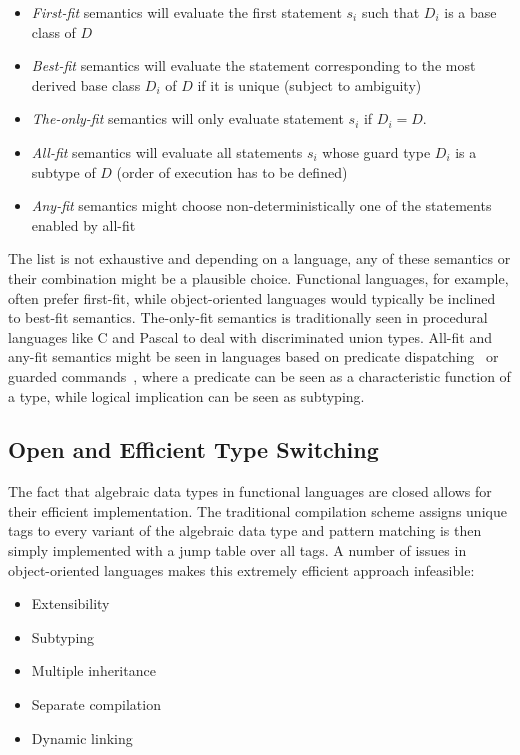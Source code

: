 \documentclass[preprint]{sigplanconf}
\begin{document}
\begin{itemize}
\setlength{\itemsep}{0pt}
\setlength{\parskip}{0pt}
\item \emph{First-fit} semantics will evaluate the first statement $s_i$ such 
      that $D_i$ is a base class of $D$
\item \emph{Best-fit} semantics will evaluate the statement corresponding to the 
      most derived base class $D_i$ of $D$ if it is unique (subject to 
      ambiguity)
\item \emph{The-only-fit} semantics will only evaluate statement $s_i$ if $D_i=D$.
\item \emph{All-fit} semantics will evaluate all statements $s_i$ whose guard 
      type $D_i$ is a subtype of $D$ (order of execution has to be defined)
\item \emph{Any-fit} semantics might choose non-deterministically one of the 
      statements enabled by all-fit
\end{itemize}

\noindent
The list is not exhaustive and depending on a language, any of these semantics 
or their combination might be a plausible choice. Functional languages, for 
example, often prefer first-fit, while object-oriented languages would typically 
be inclined to best-fit semantics. The-only-fit semantics is traditionally seen 
in procedural languages like C and Pascal to deal with discriminated union types. 
All-fit and any-fit semantics might be seen in languages based on predicate 
dispatching~\cite{ErnstKC98} or guarded commands~\cite{EWD:EWD472}, where a 
predicate can be seen as a characteristic function of a type, while logical 
implication can be seen as subtyping.

\subsection{Open and Efficient Type Switching}
\label{sec:poets}

The fact that algebraic data types in functional languages are closed allows for 
their efficient implementation. The traditional compilation scheme assigns unique 
tags to every variant of the algebraic data type and pattern matching is then 
simply implemented with a jump table over all tags. A number of issues in 
object-oriented languages makes this extremely efficient approach infeasible:

\begin{itemize}
\setlength{\itemsep}{0pt}
\setlength{\parskip}{0pt}
\item Extensibility
\item Subtyping
\item Multiple inheritance
\item Separate compilation
\item Dynamic linking 
\end{itemize}
\end{document}
